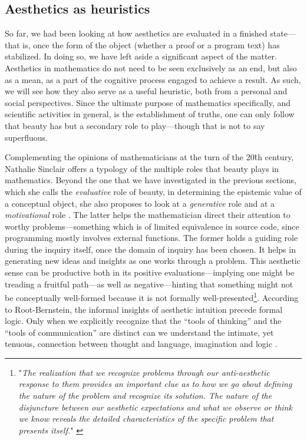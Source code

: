 \subsection{Aesthetics as heuristics}
\label{subsec:aesthetics-heuristics}

So far, we had been looking at how aesthetics are evaluated in a finished state—that is, once the form of the object (whether a proof or a program text) has stabilized. In doing so, we have left aside a significant aspect of the matter. Aesthetics in mathematics do not need to be seen exclusively as an end, but also as a mean, as a part of the cognitive process engaged to achieve a result. As such, we will see how they also serve as a useful heuristic, both from a personal and social perspectives. Since the ultimate purpose of mathematics specifically, and scientific activities in general, is the establishment of truths, one can only follow that beauty has but a secondary role to play—though that is not to say superfluous.

Complementing the opinions of mathematicians at the turn of the 20\^{th} century, Nathalie Sinclair offers a typology of the multiple roles that beauty plays in mathematics. Beyond the one that we have investigated in the previous sections, which she calls the \emph{evaluative} role of beauty, in determining the epistemic value of a conceptual object, she also proposes to look at a \emph{generative} role and at a \emph{motivational} role \citep{sinclair_aesthetic_2011}. The latter helps the mathematician direct their attention to worthy problems—something which is of limited equivalence in source code, since programming mostly involves external functions. The former holds a guiding role during the inquiry itself, once the domain of inquiry has been chosen. It helps in generating new ideas and insights as one works through a problem. This aesthetic sense can be productive both in its positive evaluations—implying one might be treading a fruitful path—as well as negative—hinting that something might not be conceptually well-formed because it is not formally well-presented\footnote{"\emph{The realization that we recognize problems through our anti-aesthetic response to them provides an important clue as to how we go about defining the nature of the problem and recognize its solution. The nature of the disjuncture between our aesthetic expectations and what we observe or think we know reveals the detailed characteristics of the specific problem that presents itself.}" \citep{root-bernstein_aesthetic_2002}}. According to Root-Bernstein, the informal insights of aesthetic intuition precede formal logic. Only when we explicitly recognize that the “tools of thinking” and the “tools of communication” are distinct can we understand the intimate, yet tenuous, connection between thought and language, imagination and logic \citep{root-bernstein_aesthetic_2002}.


